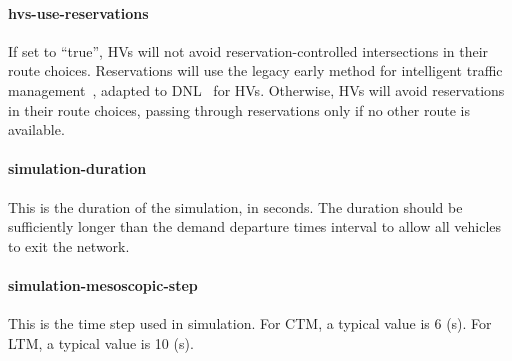 \paragraph*{hvs-use-reservations}
If set to ``true'', HVs will not avoid reservation-controlled intersections in their route choices. Reservations will use the legacy early method for intelligent traffic management~\cite{conde2013intelligent}, adapted to DNL~\cite{levin2016multiclass} for HVs. Otherwise, HVs will avoid reservations in their route choices, passing through reservations only if no other route is available.

\paragraph*{simulation-duration}
This is the duration of the simulation, in seconds. The duration should be sufficiently longer than the demand departure times interval to allow all vehicles to exit the network.

\paragraph*{simulation-mesoscopic-step}
This is the time step used in simulation. For CTM, a typical value is 6 (s). For LTM, a typical value is 10 (s).














